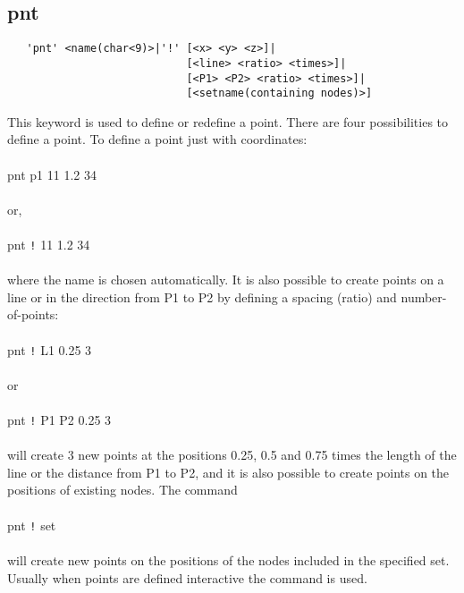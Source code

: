 \documentclass{article}
\begin{document}
\subsection{\label{pnt}pnt}
\begin{verbatim}
   'pnt' <name(char<9)>|'!' [<x> <y> <z>]|
                            [<line> <ratio> <times>]|
                            [<P1> <P2> <ratio> <times>]|
                            [<setname(containing nodes)>] 
\end{verbatim}
This keyword is used to define or redefine a point. There are four possibilities to define a point. To define a point just with coordinates:\\\\
pnt p1 11 1.2 34\\\\or,\\\\
pnt \verb_!_ 11 1.2 34\\\\where the name is chosen automatically. It is also possible to create points on a line or in the direction from P1 to P2 by defining a spacing (ratio) and number-of-points:\\\\
pnt \verb_!_ L1 0.25 3\\\\or\\\\
pnt \verb_!_ P1 P2 0.25 3\\\\will create 3 new points at the positions 0.25, 0.5 and 0.75 times the length of the line or the distance from P1 to P2, and it is also possible to create points on the positions of existing nodes. The command\\\\
pnt \verb_!_ set\\\\will create new points on the positions of the nodes included in the specified set. Usually when points are defined interactive the command  is used.
 
\end{document}
